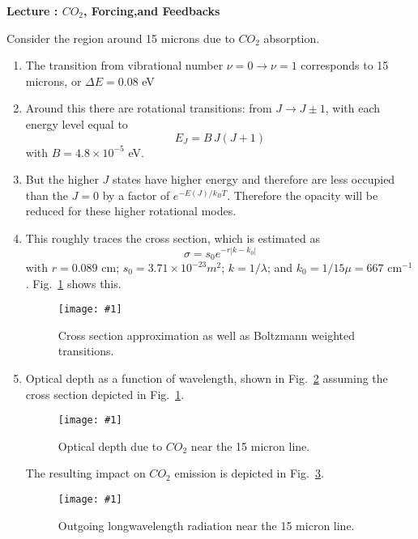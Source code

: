 \documentclass[11pt]{book}
\def\be{\begin{equation}}
\def\ee{\end{equation}}
\newcommand{\sfig}[2]{
\texttt{[image: \#1]}
        }
\newcommand{\Spng}[2]{
   \begin{figure}[thbp]
   \begin{center}
    \sfig{../Figures/#1.png}{0.7\columnwidth}
    \caption{{\small #2}}
    \label{fig:#1}
     \end{center}
   \end{figure}
}
\newcommand{\rf}[1]{\ref{fig:#1}}
\newcommand\bei{\begin{itemize}}
\newcommand\eei{\end{itemize}}
\newcommand\bee{\begin{enumerate}}
\newcommand\eee{\end{enumerate}}
\newcommand\lecture[1]{\newpage
\addtocounter{lectureno}{1}
\setcounter{secno}{0}
\begin{center}
 {\bf Lecture \arabic{lectureno}: #1}
\end{center}
}
\newcounter{lectureno}
\newcounter{secno}
\begin{document}
%
%

\lecture{$CO_2$, Forcing,and Feedbacks}

Consider the region around 15 microns due to $CO_2$ absorption.
\bee
\item The transition from vibrational number $\nu=0\rightarrow \nu=1$ corresponds to 15 microns, or $\Delta E = 0.08$ eV
\item Around this there are rotational transitions: from $J\rightarrow J\pm 1$, with each energy level equal to 
\be
E_J = B\, J(J+1)
\ee
with $B=4.8\times 10^{-5}$ eV.
\item But the higher $J$ states have higher energy and therefore are less occupied than the $J=0$ by a factor of $e^{-E(J)/k_BT}$. Therefore the opacity will be reduced for these higher rotational modes.
\item This roughly traces the cross section, which is estimated as%
\be
\sigma = s_0 e^{-r|k-k_0|}
\ee
with $r=0.089$ cm; $s_0=3.71\times 10^{-23}m^2$;  $k=1/\lambda$; and $k_0=1/15 \mu=667$ cm$^{-1}$. Fig.~\rf{co2cross} shows this.
\Spng{co2cross}{Cross section approximation as well as Boltzmann weighted transitions.}
\item Optical depth as a function of wavelength, shown in Fig.~\rf{opticaldepth} assuming the cross section depicted in Fig.~\rf{co2cross}. 
\Spng{opticaldepth}{Optical depth due to $CO_2$ near the 15 micron line.}
The resulting impact on $CO_2$ emission is depicted in Fig.~\rf{olr_15}.
\Spng{olr_15}{Outgoing longwavelength radiation near the 15 micron line.}
\eee
\end{document}
